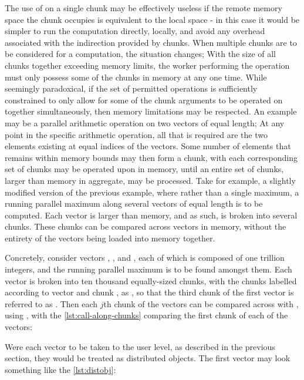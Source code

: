 The use of  on a single chunk may be effectively
useless if the remote memory space the chunk occupies is equivalent to
the local space - in this case it would be simpler to run the
computation directly, locally, and avoid any overhead associated with
the indirection provided by chunks. When multiple chunks are to be
considered for a computation, the situation changes; With the size of
all chunks together exceeding memory limits, the worker performing the
operation must only possess some of the chunks in memory at any one
time. While seemingly paradoxical, if the set of permitted operations is
sufficiently constrained to only allow for some of the chunk arguments
to be operated on together simultaneously, then memory limitations may
be respected. An example may be a parallel arithmetic operation on two
vectors of equal length; At any point in the specific arithmetic
operation, all that is required are the two elements existing at equal
indices of the vectors. Some number of elements that remains within
memory bounds may then form a chunk, with each corresponding set of
chunks may be operated upon in memory, until an entire set of chunks,
larger than memory in aggregate, may be processed. Take for example, a
slightly modified version of the previous example, where rather than a
single maximum, a running parallel maximum along several vectors of
equal length is to be computed. Each vector is larger than memory, and
as such, is broken into several chunks. These chunks can be compared
across vectors in memory, without the entirety of the vectors being
loaded into memory together.

Concretely, consider vectors , , and ,
each of which is composed of one trillion integers, and the running
parallel maximum is to be found amongst them. Each vector is broken into
ten thousand equally-sized chunks, with the chunks labelled according to
vector  and chunk , as , so that the
third chunk of the first vector is referred to as . Then
each \(j\)th chunk of the vectors can be compared across with
, using , with the \cref{lst:call-along-chunks}
comparing the first chunk of each of the vectors:


Were each vector to be taken to the user level, as described in the
previous section, they would be treated as distributed objects. The
first vector  may look something like the \cref{lst:distobj}:

